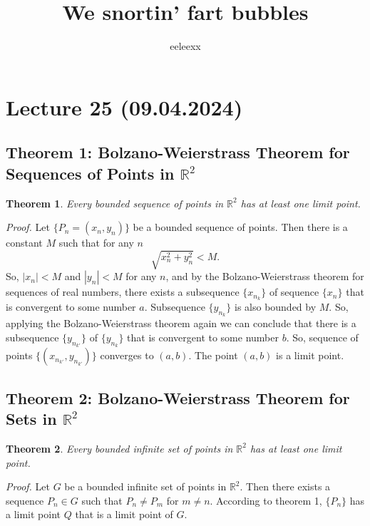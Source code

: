 \documentclass{article}
\author{eeleexx}
\title{We snortin' fart bubbles}
\newtheorem{theorem}{Theorem}
\begin{document}
\maketitle

\section*{Lecture 25 (09.04.2024)}

\subsection*{Theorem 1: Bolzano-Weierstrass Theorem for Sequences of Points in $\mathbb{R}^2$}

\begin{theorem}
Every bounded sequence of points in $\mathbb{R}^2$ has at least one limit point.
\end{theorem}

\vspace{1em}

\textit{Proof.} Let $\{P_n = (x_n, y_n)\}$ be a bounded sequence of points. Then there is a constant $M$ such that for any $n$
\[
\sqrt{x_n^2 + y_n^2} < M.
\]
So, $|x_n| < M$ and $|y_n| < M$ for any $n$, and by the Bolzano-Weierstrass theorem for sequences of real numbers, there exists a subsequence $\{x_{n_k}\}$ of sequence $\{x_n\}$ that is convergent to some number $a$. Subsequence $\{y_{n_k}\}$ is also bounded by $M$. So, applying the Bolzano-Weierstrass theorem again we can conclude that there is a subsequence $\{y_{n_{k'}}\}$ of $\{y_{n_k}\}$ that is convergent to some number $b$. So, sequence of points $\{(x_{n_{k'}}, y_{n_{k'}})\}$ converges to $(a, b)$. The point $(a, b)$ is a limit point.

\subsection*{Theorem 2: Bolzano-Weierstrass Theorem for Sets in $\mathbb{R}^2$}

\begin{theorem}
Every bounded infinite set of points in $\mathbb{R}^2$ has at least one limit point.
\end{theorem}

\vspace{1em}

\textit{Proof.} Let $G$ be a bounded infinite set of points in $\mathbb{R}^2$. Then there exists a sequence $P_n \in G$ such that $P_n \neq P_m$ for $m \neq n$. According to theorem 1, $\{P_n\}$ has a limit point $Q$ that is a limit point of $G$.
\end{document}
